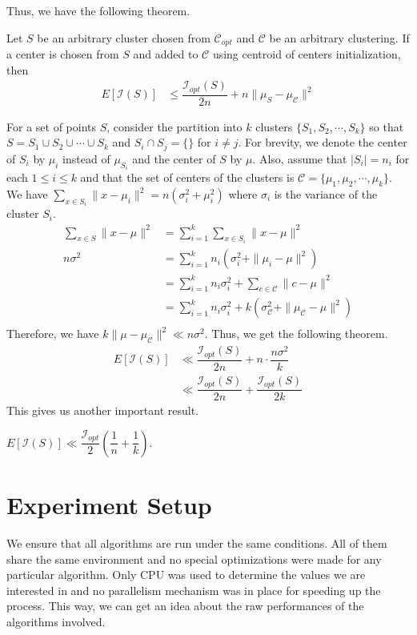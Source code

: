 \documentclass[twoside, 11pt]{article}
\newcommand{\C}{\mathcal{C}}
\newcommand{\I}{\mathcal{I}}
\begin{document}
	Thus, we have the following theorem.
		\begin{theorem}
			Let $S$ be an arbitrary cluster chosen from $\C_{opt}$ and $\C$ be an arbitrary clustering. If a center is chosen from $S$ and added to $\C$ using centroid of centers initialization, then
				\begin{align*}
					E[\I(S)] & \leq \dfrac{\I_{opt}(S)}{2n}+n\|\mu_{S}-\mu_{\C}\|^2
				\end{align*}
		\end{theorem}
	For a set of points $S$, consider the partition into $k$ clusters $\{S_1,S_2,\cdots,S_k\}$ so that $S=S_1\cup S_2\cup\cdots\cup S_k$ and $S_i\cap S_j=\{\}$ for $i\neq j$. For brevity, we denote the center of $S_i$ by $\mu_i$ instead of $\mu_{S_i}$ and the center of $S$ by $\mu$. Also, assume that $|S_i|=n_i$ for each $1\leq i\leq k$ and that the set of centers of the clusters is $\mathcal{C}=\{\mu_1,\mu_2,\cdots,\mu_k\}$. We have $\sum_{x\in S_i}\|x-\mu_i\|^2 = n(\sigma_i^2+\mu_i^2)$ where $\sigma_i$ is the variance of the cluster $S_i$.
		\begin{align*}
			\sum_{x\in S}\|x-\mu\|^2 
				& = \sum_{i=1}^k\sum_{x\in S_i}\|x-\mu\|^2\\
			n\sigma^2
				& = \sum_{i=1}^kn_i(\sigma_i^2+\|\mu_i-\mu\|^2)\\
				& = \sum_{i=1}^kn_i\sigma_i^2+\sum_{c\in\C}\|c-\mu\|^2\\
				& = \sum_{i=1}^kn_i\sigma_i^2+k(\sigma_{\C}^2+\|\mu_{\C}-\mu\|^2)\\
		\end{align*}
	Therefore, we have $k\|\mu-\mu_{\C}\|^2\ll n\sigma^2$. Thus, we get the following theorem.
		\begin{align*}
			E[\I(S)] & \ll \dfrac{\I_{opt}(S)}{2n}+n\cdot\dfrac{n\sigma^2}{k}\\
					 & \ll \dfrac{\I_{opt}(S)}{2n}+\dfrac{\I_{opt}(S)}{2k}
		\end{align*}
	This gives us another important result.
		\begin{theorem}
			$E[\I(S)]\ll \dfrac{\I_{opt}}{2}\left(\dfrac{1}{n}+\dfrac{1}{k}\right)$.
		\end{theorem}
	\section{Experiment Setup}
	We ensure that all algorithms are run under the same conditions. All of them share the same environment and no special optimizations were made for any particular algorithm. Only CPU was used to determine the values we are interested in and no parallelism mechanism was in place for speeding up the process. This way, we can get an idea about the raw performances of the algorithms involved.
	
\end{document}
